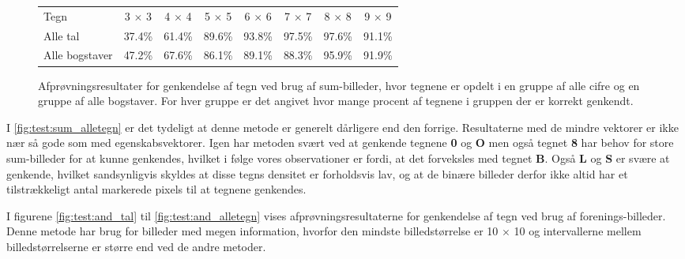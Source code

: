 \begin{figure}[htp]
\centering
\begin{tabular}{|l|c|c|c|c|c|c|c|}\hline
\rowcolor[gray]{0.9} \multicolumn{8}{|>{\columncolor[gray]{0.9}}c|}{\textbf{Genkendelse af tegn - Sum-billeder}} \\ \hline
Tegn & 3 $\times$ 3 & 4 $\times$ 4 & 5 $\times$ 5 & 6 $\times$ 6 & 7 $\times$ 7 & 8 $\times$ 8 & 9 $\times$ 9 \\\hline
Alle tal & 37.4\% & 61.4\% & 89.6\% & 93.8\% & 97.5\% & 97.6\% & 91.1\%\\\hline
Alle bogstaver & 47.2\% & 67.6\% & 86.1\% & 89.1\% & 88.3\% & 95.9\% & 91.9\%\\\hline
\end{tabular}
\caption{Afprøvningsresultater for genkendelse af tegn ved brug af sum-billeder, hvor tegnene er opdelt i en gruppe af alle cifre og en gruppe af alle bogstaver. For hver gruppe er det angivet hvor mange procent af tegnene i gruppen der er korrekt genkendt.}
\label{fig:test:sum_alletegn}
\end{figure}


I \vref{fig:test:sum_alletegn} er det tydeligt at denne metode er generelt dårligere end den forrige. Resultaterne med de mindre vektorer er ikke nær så gode som med egenskabsvektorer. Igen har metoden svært ved at genkende tegnene \textbf{0} og \textbf{O} men også tegnet \textbf{8} har behov for store sum-billeder for at kunne genkendes, hvilket i følge vores observationer er fordi, at det forveksles med tegnet \textbf{B}. Også \textbf{L} og \textbf{S} er svære at genkende, hvilket sandsynligvis skyldes at disse tegns densitet er forholdsvis lav, og at de binære billeder derfor ikke altid har et tilstrækkeligt antal markerede pixels til at tegnene genkendes.

I figurene \ref{fig:test:and_tal} til \ref{fig:test:and_alletegn} vises afprøvningsresultaterne for genkendelse af tegn ved brug af forenings-billeder. Denne metode har brug for billeder med megen information, hvorfor den mindste billedstørrelse er 10 $\times$ 10 og intervallerne mellem billedstørrelserne er større end ved de andre metoder.

